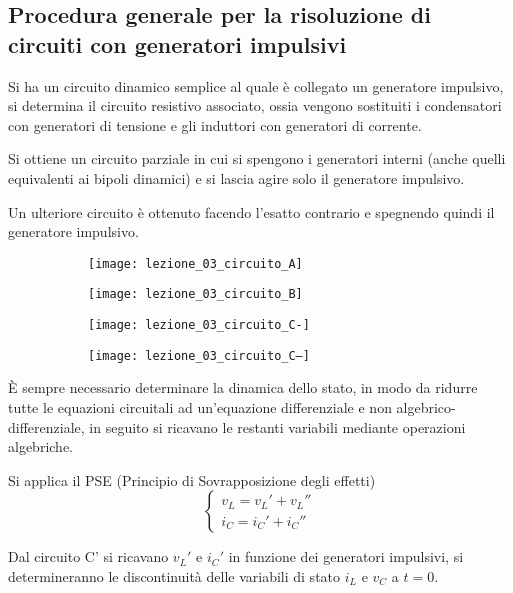 \subsection{Procedura generale per la risoluzione di circuiti con generatori impulsivi}
Si ha un circuito dinamico semplice al quale è collegato un generatore impulsivo,
si determina il circuito resistivo associato, ossia vengono sostituiti i condensatori con 
generatori di tensione e gli induttori con generatori di corrente.

Si ottiene un circuito parziale in cui si spengono i generatori interni (anche quelli equivalenti ai bipoli dinamici) e si lascia agire solo il generatore impulsivo.

Un ulteriore circuito è ottenuto facendo l'esatto contrario e spegnendo quindi il generatore impulsivo.

\begin{figure}[H]\centering
\begin{subfigure}{0.45\linewidth}\centering
\texttt{[image: lezione\_03\_circuito\_A]}
\end{subfigure}
\begin{subfigure}{0.45\linewidth}\centering
\texttt{[image: lezione\_03\_circuito\_B]}
\end{subfigure}
\begin{subfigure}{0.45\linewidth}\centering
\texttt{[image: lezione\_03\_circuito\_C-]}
\end{subfigure}
\begin{subfigure}{0.4\linewidth}\centering
\texttt{[image: lezione\_03\_circuito\_C--]}
\end{subfigure}
\end{figure}
È sempre necessario determinare la dinamica dello stato, in modo da ridurre tutte le equazioni circuitali
ad un'equazione differenziale e non algebrico-differenziale, in seguito si ricavano le restanti 
variabili mediante operazioni algebriche.

Si applica il PSE (Principio di Sovrapposizione degli effetti)
$$
\begin{cases}
v_L = v_L' + v_L''\\
i_C = i_C' + i_C''
\end{cases}
$$

Dal circuito C' si ricavano $v_L'$ e $i_C'$ in funzione dei generatori impulsivi, si determineranno le 
discontinuità delle variabili di stato $i_L$ e $v_C$ a $t=0$.

